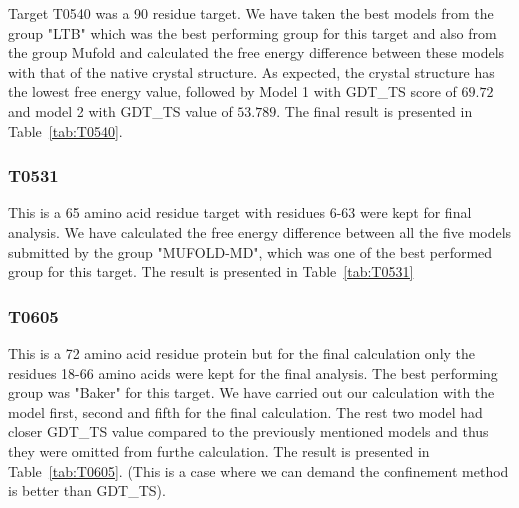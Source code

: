 \documentclass[12pt]{article}
\begin{document}
Target T0540 was a 90 residue target. We have taken the best models from the group "LTB" which was the best performing group for this target and
also from the group Mufold and calculated the free energy difference between these models with that of the native crystal structure.
As expected, the crystal structure has the lowest free energy value, followed by Model 1 with GDT\_TS score of $69.72$ and model 2
with GDT\_TS value of $53.789$. The final result is presented in Table~\protect\ref{tab:T0540}. 


\subsubsection{T0531}

This is a 65 amino acid residue target with residues 6-63 were kept for final analysis. We have calculated the free energy
difference between all the five models submitted by the group "MUFOLD-MD", which was one of the best performed group for this target.
The result is presented in Table~\protect\ref{tab:T0531}



\subsubsection{T0605}
This is a 72 amino acid residue protein but for the final calculation only the residues 18-66 amino acids were kept for the final analysis.
The best performing group was "Baker" for this target. We have carried out our calculation with the model first, second and fifth for the
final calculation. The rest two model had closer GDT\_TS value compared to the previously mentioned models and thus they were omitted from 
furthe calculation. The result is presented in Table~\protect\ref{tab:T0605}. (This is a case where we can demand the confinement 
method is better than GDT\_TS).   
\end{document}
